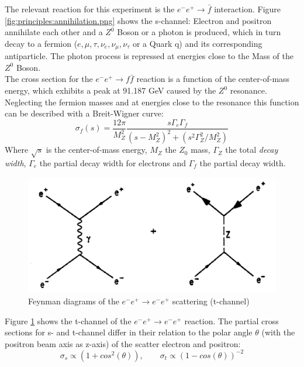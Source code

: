 The relevant reaction for this experiment is the $e^-e^+\rightarrow\bar{f}$ interaction. Figure \ref{fig:principles:annihilation.png} shows the s-channel: Electron and positron annihilate each other and a $Z^0$ Boson or a photon is produced, which in turn decay to a fermion ($e,\mu,\tau,\nu_e,\nu_{\mu},\nu_{\tau}$ or a Quark q) and its corresponding antiparticle. The photon process is repressed at energies close to the Mass of the $Z^0$ Boson\cite{muenchen}.\\%
The cross section for the $e^-e^+\rightarrow f\bar{f}$ reaction is a function of the center-of-mass energy, which exhibits a peak at 91.187 GeV caused by the $Z^0$ resonance. Neglecting the fermion masses and at energies close to the resonance this function can be described with a Breit-Wigner curve\cite{staatsex}:
\begin{equation}
\sigma_f(s) = \frac{12\pi}{M_Z^2} \frac{s\Gamma_e\Gamma_f}{(s-M_Z^2)^2+(s^2\Gamma_Z^2/M_Z^2)}
\label{eq:principles:breitwigner}
\end{equation}
Where $\sqrt{s}$ is the center-of-mass energy, $M_Z$ the $Z_0$ mass, $\Gamma_Z$ the total \emph{decay width}, $\Gamma_e$ the partial decay width for electrons and $\Gamma_f$ the partial decay width.
\begin{figure}[H]
	\centering
	\includegraphics{graphics/BhabbaStreuung.png}
	\caption{Feynman diagrams of the $e^-e^+ \rightarrow e^-e^+$ scattering (t-channel)}
	\label{fig:principles:BhabbaStreuung.png}
\end{figure}
Figure \ref{fig:principles:BhabbaStreuung.png} shows the t-channel of the  $e^-e^+ \rightarrow e^-e^+$ reaction. The partial cross sections for s- and t-channel differ in their relation to the polar angle $\theta$ (with the positron beam axis as z-axis) of the scatter electron and positron\cite{anleitung}:
\begin{equation}
\sigma_s \propto (1+cos^2(\theta)),\qquad\sigma_t \propto (1-cos(\theta))^{-2}
\label{eq:principles:s-t-channel}
\end{equation}
